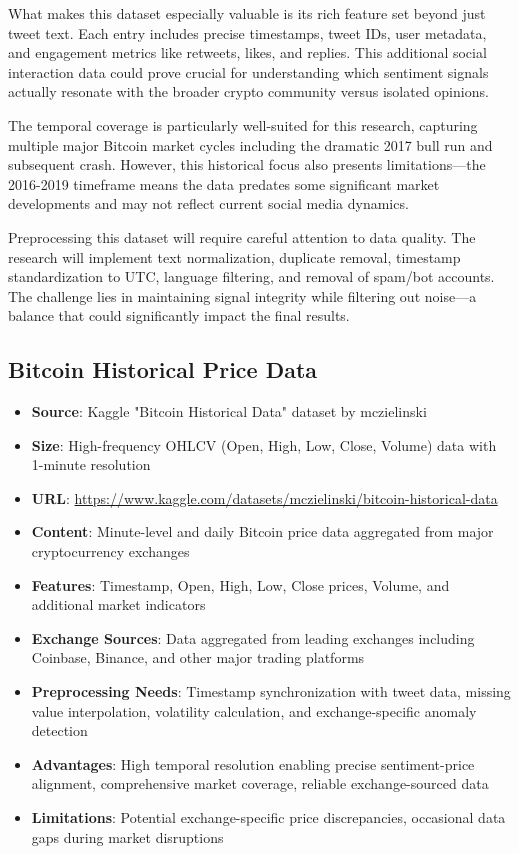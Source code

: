 \documentclass[11pt,twocolumn]{article}
\begin{document}
What makes this dataset especially valuable is its rich feature set beyond just tweet text. Each entry includes precise timestamps, tweet IDs, user metadata, and engagement metrics like retweets, likes, and replies. This additional social interaction data could prove crucial for understanding which sentiment signals actually resonate with the broader crypto community versus isolated opinions.

The temporal coverage is particularly well-suited for this research, capturing multiple major Bitcoin market cycles including the dramatic 2017 bull run and subsequent crash. However, this historical focus also presents limitations—the 2016-2019 timeframe means the data predates some significant market developments and may not reflect current social media dynamics.

Preprocessing this dataset will require careful attention to data quality. The research will implement text normalization, duplicate removal, timestamp standardization to UTC, language filtering, and removal of spam/bot accounts. The challenge lies in maintaining signal integrity while filtering out noise—a balance that could significantly impact the final results.

\subsection{\textbf{Bitcoin Historical Price Data}}
\begin{itemize}
\item \textbf{Source}: Kaggle "Bitcoin Historical Data" dataset by mczielinski
\item \textbf{Size}: High-frequency OHLCV (Open, High, Low, Close, Volume) data with 1-minute resolution
\item \textbf{URL}: \url{https://www.kaggle.com/datasets/mczielinski/bitcoin-historical-data}
\item \textbf{Content}: Minute-level and daily Bitcoin price data aggregated from major cryptocurrency exchanges
\item \textbf{Features}: Timestamp, Open, High, Low, Close prices, Volume, and additional market indicators
\item \textbf{Exchange Sources}: Data aggregated from leading exchanges including Coinbase, Binance, and other major trading platforms
\item \textbf{Preprocessing Needs}: Timestamp synchronization with tweet data, missing value interpolation, volatility calculation, and exchange-specific anomaly detection
\item \textbf{Advantages}: High temporal resolution enabling precise sentiment-price alignment, comprehensive market coverage, reliable exchange-sourced data
\item \textbf{Limitations}: Potential exchange-specific price discrepancies, occasional data gaps during market disruptions
\end{itemize}
\end{document}

